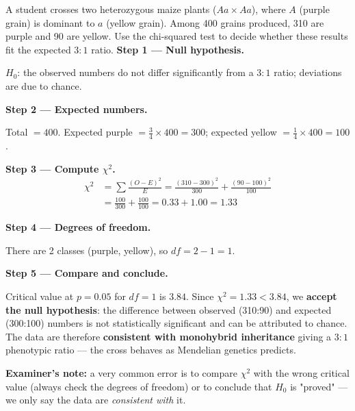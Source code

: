 \documentclass[11pt]{article}
\begin{document}
\begin{exoresolu}
A student crosses two heterozygous maize plants ($Aa \times Aa$), where $A$ (purple grain) is dominant to $a$ (yellow grain). Among 400 grains produced, 310 are purple and 90 are yellow. Use the chi-squared test to decide whether these results fit the expected $3:1$ ratio.
\tcblower
\textbf{Step 1 — Null hypothesis.}

$H_0$: the observed numbers do not differ significantly from a $3:1$ ratio; deviations are due to chance.

\textbf{Step 2 — Expected numbers.}

Total $= 400$. Expected purple $= \tfrac{3}{4} \times 400 = 300$; expected yellow $= \tfrac{1}{4} \times 400 = 100$.

\textbf{Step 3 — Compute $\chi^2$.}
\begin{align*}
\chi^2 &= \sum \frac{(O-E)^2}{E} = \frac{(310-300)^2}{300} + \frac{(90-100)^2}{100} \\
&= \frac{100}{300} + \frac{100}{100} = 0.33 + 1.00 = 1.33
\end{align*}

\textbf{Step 4 — Degrees of freedom.}

There are 2 classes (purple, yellow), so $df = 2 - 1 = 1$.

\textbf{Step 5 — Compare and conclude.}

Critical value at $p = 0.05$ for $df = 1$ is $3.84$. Since $\chi^2 = 1.33 < 3.84$, we \textbf{accept the null hypothesis}: the difference between observed (310:90) and expected (300:100) numbers is not statistically significant and can be attributed to chance. The data are therefore \textbf{consistent with monohybrid inheritance} giving a $3:1$ phenotypic ratio — the cross behaves as Mendelian genetics predicts.

\textbf{Examiner's note:} a very common error is to compare $\chi^2$ with the wrong critical value (always check the degrees of freedom) or to conclude that $H_0$ is "proved" — we only say the data are \emph{consistent with} it.
\end{exoresolu}
\end{document}
